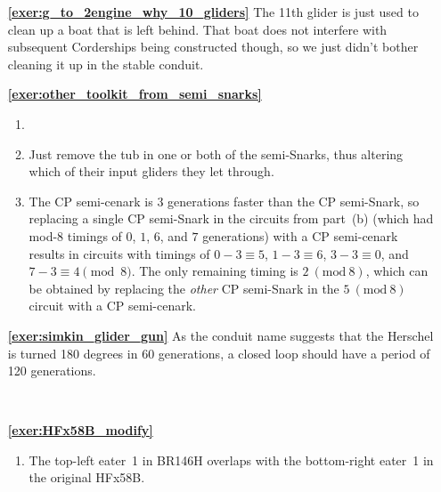 \begin{multicols}{2}
\begin{itemize}[leftmargin=0em]
		\item[\bf\color{ocre}\sffamily\ref{exer:g_to_2engine_why_10_gliders}] The 11th glider is just used to clean up a boat that is left behind. That boat does not interfere with subsequent Corderships being constructed though, so we just didn't bother cleaning it up in the stable conduit.\\
		
		
		\item[\bf\color{ocre}\sffamily\ref{exer:other_toolkit_from_semi_snarks}] \begin{enumerate}[leftmargin=1.5em,label=\bf\color{ocre}(\alph*)]
			\item {} \\
			
			\item Just remove the tub in one or both of the semi-Snarks, thus altering which of their input gliders they let through.
			
			\item The CP semi-cenark is $3$ generations faster than the CP semi-Snark, so replacing a single CP semi-Snark in the circuits from part~(b) (which had mod-$8$ timings of $0$, $1$, $6$, and $7$ generations) with a CP semi-cenark results in circuits with timings of $0-3 \equiv 5$, $1 - 3 \equiv 6$, $3 - 3 \equiv 0$, and $7 - 3 \equiv 4 \pmod{8}$. The only remaining timing is $2 \ (\text{mod} \ 8)$, which can be obtained by replacing the \emph{other} CP semi-Snark in the $5 \ (\text{mod} \ 8)$ circuit with a CP semi-cenark.\\
		\end{enumerate}
		
		
		\item[\bf\color{ocre}\sffamily\ref{exer:simkin_glider_gun}] As the conduit name suggests that the Herschel is turned 180 degrees in 60 generations, a closed loop should have a period of 120 generations.
		
		\begin{center}
			 \\[0.3em]
		\end{center}
		
		
		\item[\bf\color{ocre}\sffamily\ref{exer:HFx58B_modify}] \begin{enumerate}[leftmargin=1.5em,label=\bf\color{ocre}(\alph*)]
			\item The top-left eater~1 in BR146H overlaps with the bottom-right eater~1 in the original HFx58B.
			

\end{enumerate}
\end{itemize}
\end{multicols}

